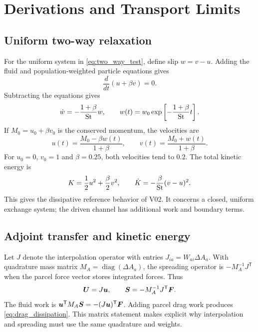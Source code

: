 \chapter{Derivations and Transport Limits}\label{app:derivations}

\section{Uniform two-way relaxation}
For the uniform system in \cref{eq:two_way_test}, define slip $w=v-u$.
Adding the fluid and population-weighted particle equations gives
\begin{equation}
 \frac{d}{dt}(u+\beta v)=0.
\end{equation}
Subtracting the equations gives
\begin{equation}
 \dot w=-\frac{1+\beta}{\mathrm{St}}w,\qquad
 w(t)=w_0\exp\left[-\frac{1+\beta}{\mathrm{St}}t\right].
\end{equation}
If $M_0=u_0+\beta v_0$ is the conserved momentum, the velocities are
\begin{equation}
 u(t)=\frac{M_0-\beta w(t)}{1+\beta},\qquad
 v(t)=\frac{M_0+w(t)}{1+\beta}.
\end{equation}
For $u_0=0$, $v_0=1$ and $\beta=0.25$, both velocities tend to $0.2$.
The total kinetic energy is
\begin{equation}
 K=\frac{1}{2}u^2+\frac{\beta}{2}v^2,
 \qquad \dot K=-\frac{\beta}{\mathrm{St}}(v-u)^2.
\end{equation}
This gives the dissipative reference behavior of V02. It concerns a
closed, uniform exchange system; the driven channel has additional work
and boundary terms.

\section{Adjoint transfer and kinetic energy}
Let $J$ denote the interpolation operator with entries
$J_{ia}=W_{ai}\Delta A_a$. With quadrature mass matrix
$M_A=\operatorname{diag}(\Delta A_a)$, the spreading operator is
$-M_A^{-1}J^{\mathsf T}$ when the parcel force vector stores integrated
forces. Thus
\begin{equation}
 \bm{U}=J\bm{u},\qquad
 \bm{S}=-M_A^{-1}J^{\mathsf T}\bm{F}.
\end{equation}
The fluid work is
$\bm{u}^{\mathsf T}M_A\bm{S}
=-(J\bm{u})^{\mathsf T}\bm{F}$.
Adding parcel drag work produces
\cref{eq:drag_dissipation}. This matrix statement makes explicit why
interpolation and spreading must use the same quadrature and weights.

